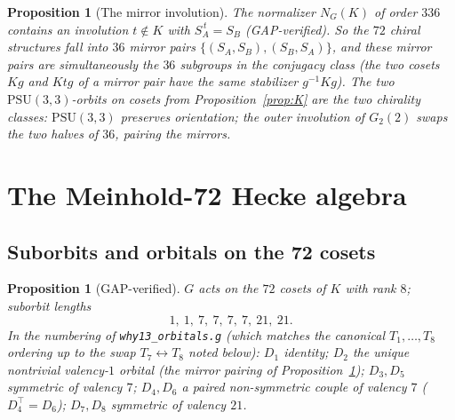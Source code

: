 \documentclass[11pt]{article}
\newtheorem{proposition}[theorem]{Proposition}
\theoremstyle{definition}
\newcommand{\PSU}{\mathrm{PSU}}
\begin{document}
\begin{proposition}[The mirror involution]\label{prop:mirror}
The normalizer $N_G(K)$ of order $336$ contains an involution $t \notin K$
with $S_A^{\,t} = S_B$ (GAP-verified). So the $72$ chiral structures fall
into $36$ mirror pairs $\{(S_A,S_B), (S_B,S_A)\}$, and these mirror pairs
are simultaneously the $36$ subgroups in the conjugacy class (the two
cosets $Kg$ and $Ktg$ of a mirror pair have the same stabilizer
$g^{-1}Kg$). The two $\PSU(3,3)$-orbits on cosets from
Proposition~\ref{prop:K} are the two \emph{chirality classes}:
$\PSU(3,3)$ preserves orientation; the outer involution of $G_2(2)$ swaps
the two halves of $36$, pairing the mirrors.
\end{proposition}

\section{The Meinhold-72 Hecke algebra}\label{sec:meinhold}

\subsection{Suborbits and orbitals on the 72 cosets}

\begin{proposition}[GAP-verified]\label{prop:suborbits72}
$G$ acts on the $72$ cosets of $K$ with rank $8$; suborbit lengths
\[
1,\ 1,\ 7,\ 7,\ 7,\ 7,\ 21,\ 21 .
\]
In the numbering of \texttt{why13\_orbitals.g} (which matches the canonical
$T_1,\dots,T_8$ ordering up to the swap $T_7 \leftrightarrow T_8$ noted
below): $D_1$ identity; $D_2$ the unique nontrivial valency-$1$ orbital
(the \emph{mirror} pairing of Proposition~\ref{prop:mirror}); $D_3, D_5$
symmetric of valency $7$; $D_4, D_6$ a paired non-symmetric couple of
valency $7$ ($D_4^\top = D_6$); $D_7, D_8$ symmetric of valency $21$.
\end{proposition}
\end{document}
